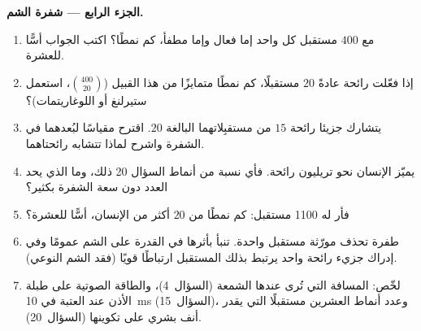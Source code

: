 \begin{problem}
\medskip
\noindent\textbf{الجزء الرابع --- شفرة الشم.}
\begin{enumerate}[resume]
  \item مع $400$ مستقبل كل واحد إما فعال وإما مطفأ، كم نمطًا؟
        اكتب الجواب أسًّا للعشرة.
  \item إذا فعّلت رائحة عادةً $20$ مستقبلًا، كم نمطًا متمايزًا
        من هذا القبيل ($\binom{400}{20}$، استعمل ستيرلنغ أو
        اللوغاريتمات)؟
  \item يتشارك جزيئا رائحة $15$ من مستقبِلاتهما البالغة
        $20$. اقترح مقياسًا لبُعدهما في الشفرة واشرح لماذا
        تتشابه رائحتاهما.
  \item يميّز الإنسان نحو تريليون رائحة. فأي نسبة من أنماط
        السؤال 20 ذلك، وما الذي يحد العدد دون سعة الشفرة
        بكثير؟
  \item فأر له \num{1100} مستقبل: كم نمطًا من $20$ أكثر من
        الإنسان، أسًّا للعشرة؟
  \item طفرة تحذف مورّثة مستقبل واحدة. تنبأ بأثرها في القدرة
        على الشم عمومًا وفي إدراك جزيء رائحة واحد يرتبط بذلك
        المستقبل ارتباطًا قويًا (فقد الشم النوعي).
  \item لخّص: المسافة التي تُرى عندها الشمعة (السؤال~4)،
        والطاقة الصوتية على طبلة الأذن عند العتبة في
        \qty{10}{ms} (السؤال~15)، وعدد أنماط العشرين مستقبلًا
        التي يقدر أنف بشري على تكوينها (السؤال~20).
\end{enumerate}
\end{problem}
